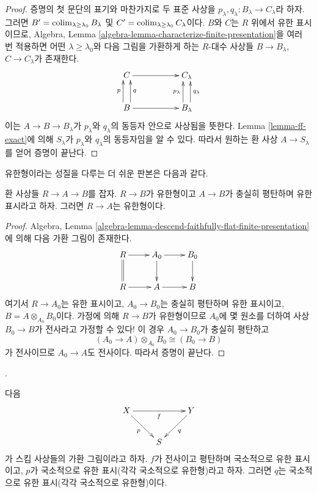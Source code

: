\begin{proof}
\medskip\noindent
증명의 첫 문단의 표기와 마찬가지로 두 표준 사상을
$p_\lambda, q_\lambda : B_\lambda \to C_\lambda$라 하자. 그러면
$B' = \mathop{\mathrm{colim}}\nolimits_{\lambda \geq \lambda_0} B_\lambda$ 및
$C' = \mathop{\mathrm{colim}}\nolimits_{\lambda \geq \lambda_0} C_\lambda$이다. $B$와 $C$는 $R$
위에서 유한 표시이므로, Algebra, Lemma
\ref{algebra-lemma-characterize-finite-presentation}을 여러 번 적용하면 어떤
$\lambda \geq \lambda_0$와 다음 그림을 가환하게 하는 $R$-대수 사상들
$B \to B_\lambda$, $C \to C_\lambda$가 존재한다.
$$
\xymatrix{
C \ar[rr] & &
C_\lambda \\
B \ar[rr]
\ar@<1ex>[u]^-p
\ar@<-1ex>[u]_-q
& &
B_\lambda
\ar@<1ex>[u]^-{p_\lambda}
\ar@<-1ex>[u]_-{q_\lambda}
}
$$
이는 $A \to B \to B_\lambda$가 $p_\lambda$와 $q_\lambda$의 동등자 안으로
사상됨을 뜻한다. Lemma \ref{lemma-ff-exact}에 의해 $S_\lambda$가
$p_\lambda$와 $q_\lambda$의 동등자임을 알 수 있다. 따라서 원하는 환 사상
$A \to S_\lambda$를 얻어 증명이 끝난다.
\end{proof}

\noindent
유한형이라는 성질을 다루는 더 쉬운 판본은 다음과 같다.

\begin{lemma}
\label{lemma-finite-type-local-source-fppf-algebra}
환 사상들 $R \to A \to B$를 잡자. $R \to B$가 유한형이고
$A \to B$가 충실히 평탄하며 유한 표시라고 하자. 그러면
$R \to A$는 유한형이다.
\end{lemma}

\begin{proof}
Algebra, Lemma
\ref{algebra-lemma-descend-faithfully-flat-finite-presentation}에 의해 다음
가환 그림이 존재한다.
$$
\xymatrix{
R \ar[r] \ar@{=}[d] &
A_0 \ar[d] \ar[r] &
B_0 \ar[d] \\
R \ar[r] & A \ar[r] & B
}
$$
여기서 $R \to A_0$는 유한 표시이고, $A_0 \to B_0$는 충실히 평탄하며
유한 표시이고, $B = A \otimes_{A_0} B_0$이다. 가정에 의해 $R \to B$가
유한형이므로 $A_0$에 몇 원소를 더하여 사상 $B_0 \to B$가 전사라고
가정할 수 있다! 이 경우 $A_0 \to B_0$가 충실히 평탄하고
$$
(A_0 \to A) \otimes_{A_0} B_0 \cong (B_0 \to B)
$$
가 전사이므로 $A_0 \to A$도 전사이다. 따라서 증명이 끝난다.
\end{proof}

\begin{lemma}
\label{lemma-flat-finitely-presented-permanence}
\begin{reference}
\cite[IV, 17.7.5 (i) and (ii)]{EGA}.
\end{reference}
다음
$$
\xymatrix{
X \ar[rr]_f \ar[rd]_p & &
Y \ar[dl]^q \\
& S
}
$$
가 스킴 사상들의 가환 그림이라고 하자. $f$가 전사이고 평탄하며
국소적으로 유한 표시이고, $p$가 국소적으로 유한 표시(각각 국소적으로
유한형)라고 하자. 그러면 $q$는 국소적으로 유한 표시(각각 국소적으로
유한형)이다.
\end{lemma}

